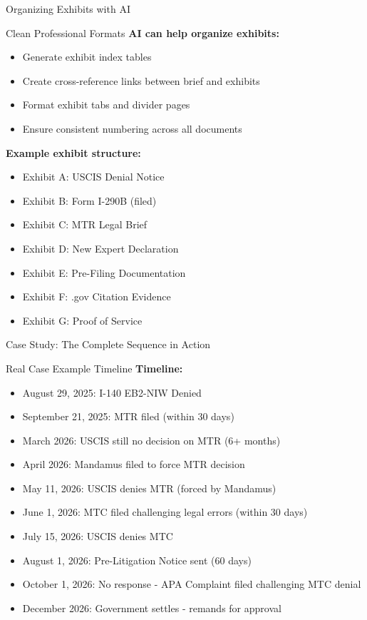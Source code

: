 \documentclass[11pt]{beamer}
\begin{document}
	\begin{frame}{Organizing Exhibits with AI}
		\scriptsize
		\begin{block}{Clean Professional Formats}
			\textbf{AI can help organize exhibits:}
			\begin{itemize}
				\item Generate exhibit index tables
				\item Create cross-reference links between brief and exhibits
				\item Format exhibit tabs and divider pages
				\item Ensure consistent numbering across all documents
			\end{itemize}
			\textbf{Example exhibit structure:}
			\begin{itemize}
				\item Exhibit A: USCIS Denial Notice
				\item Exhibit B: Form I-290B (filed)
				\item Exhibit C: MTR Legal Brief
				\item Exhibit D: New Expert Declaration
				\item Exhibit E: Pre-Filing Documentation
				\item Exhibit F: .gov Citation Evidence
				\item Exhibit G: Proof of Service
			\end{itemize}
		\end{block}
	\end{frame}
	
	
	\begin{frame}{Case Study: The Complete Sequence in Action}
		\scriptsize
		\begin{block}{Real Case Example Timeline}
			\textbf{Timeline:}
			\begin{itemize}
				\item August 29, 2025: I-140 EB2-NIW Denied
				\item September 21, 2025: MTR filed (within 30 days)
				\item March 2026: USCIS still no decision on MTR (6+ months)
				\item April 2026: Mandamus filed to force MTR decision
				\item May 11, 2026: USCIS denies MTR (forced by Mandamus)
				\item June 1, 2026: MTC filed challenging legal errors (within 30 days)
				\item July 15, 2026: USCIS denies MTC
				\item August 1, 2026: Pre-Litigation Notice sent (60 days)
				\item October 1, 2026: No response - APA Complaint filed challenging MTC denial
				\item December 2026: Government settles - remands for approval
			\end{itemize}
		\end{block}
	\end{frame}
	
\end{document}
